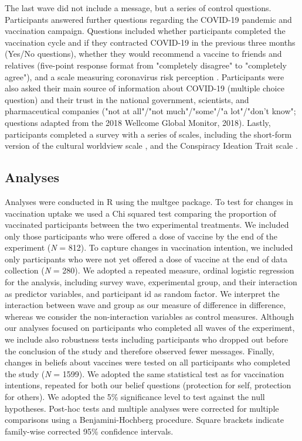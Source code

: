 \documentclass[authordate, empirical]{jote-new-article}
\begin{document}
	The last wave did not include a message, but a series of control questions. Participants answered further questions regarding the COVID-19 pandemic and vaccination campaign. Questions included whether participants completed the vaccination cycle and if they contracted COVID-19 in the previous three months (Yes/No questions), whether they would recommend a vaccine to friends and relatives (five-point response format from "completely disagree" to "completely agree"), and a scale measuring coronavirus risk perception \parencites{Savadori2021}. Participants were also asked their main source of information about COVID-19 (multiple choice question) and their trust in the national government, scientists, and pharmaceutical companies ("not at all"/"not much"/"some"/"a lot"/"don't know"; questions adapted from the 2018 Wellcome Global Monitor, 2018). Lastly, participants completed a survey with a series of scales, including the short-form version of the cultural worldview scale \parencites{Kahan2021}, and the Conspiracy Ideation Trait scale \parencites{Bode2018}.



	\subsection{Analyses}



	Analyses were conducted in R \parencites{Team2018} using the multgee \parencites{Touloumis2013} package. To test for changes in vaccination uptake we used a Chi squared test comparing the proportion of vaccinated participants between the two experimental treatments. We included only those participants who were offered a dose of vaccine by the end of the experiment (\emph{N }= 812). To capture changes in vaccination intention, we included only participants who were not yet offered a dose of vaccine at the end of data collection (\emph{N }= 280). We adopted a repeated measure, ordinal logistic regression for the analysis, including survey wave, experimental group, and their interaction as predictor variables, and participant id as random factor. We interpret the interaction between wave and group as our measure of difference in difference, whereas we consider the non-interaction variables as control measures. Although our analyses focused on participants who completed all waves of the experiment, we include also robustness tests including participants who dropped out before the conclusion of the study and therefore observed fewer messages. Finally, changes in beliefs about vaccines were tested on all participants who completed the study (\emph{N }= 1599). We adopted the same statistical test as for vaccination intentions, repeated for both our belief questions (protection for self, protection for others). We adopted the 5\% significance level to test against the null hypotheses. Post-hoc tests and multiple analyses were corrected for multiple comparisons using a Benjamini-Hochberg procedure. Square brackets indicate family-wise corrected 95\% confidence intervals.
\end{document}
